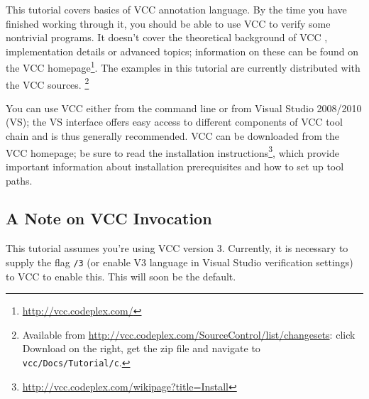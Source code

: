 This tutorial covers basics of VCC annotation language. By the time
you have finished working through it, you should be able to use VCC to
verify some nontrivial programs. It doesn't cover the theoretical
background of VCC \cite{lci}, implementation details \cite{vcc}
or advanced topics;
information on these can be found on the VCC
homepage\footnote{\url{http://vcc.codeplex.com/}}.
The examples in this tutorial are currently distributed with the VCC sources.%
\footnote{
Available from \url{http://vcc.codeplex.com/SourceControl/list/changesets}: click Download on the right,
get the zip file and navigate to \lstinline|vcc/Docs/Tutorial/c|.}

You can use VCC either from the command line or from Visual Studio
2008/2010 (VS); the VS interface offers easy access to different components of
VCC tool chain and is thus generally recommended.
VCC can be downloaded from the VCC homepage; 
be sure to read the installation instructions\footnote{\url{http://vcc.codeplex.com/wikipage?title=Install}},
which provide important information about installation prerequisites 
and how to set up tool paths.

\subsection{A Note on VCC Invocation}
\label{sect:todo-invoke}
This tutorial assumes you're using VCC version 3. 
Currently, it is necessary to supply the flag \texttt{/3}
(or enable V3 language in Visual Studio verification settings)
to VCC to enable this.
This will soon be the default.

